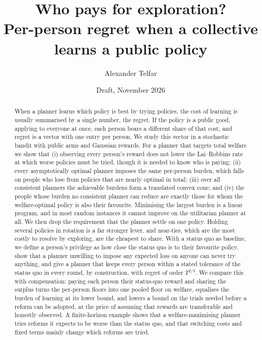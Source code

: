 \documentclass[11pt,a4paper]{article}
\title{Who pays for exploration?\\[2pt]
\large Per-person regret when a collective learns a public policy}
\author{Alexander Telfar}
\date{Draft, November 2026}
\theoremstyle{plain}
\theoremstyle{definition}
\theoremstyle{remark}
\begin{document}
\maketitle

\begin{abstract}
When a planner learns which policy is best by trying policies, the cost of learning is usually summarised by a single number, the regret. If the policy is a public good, applying to everyone at once, each person bears a different share of that cost, and regret is a vector with one entry per person. We study this vector in a stochastic bandit with public arms and Gaussian rewards. For a planner that targets total welfare we show that (i) observing every person's reward does not lower the Lai--Robbins rate at which worse policies must be tried, though it is needed to know who is paying; (ii) every asymptotically optimal planner imposes the same per-person burden, which falls on people who lose from policies that are nearly optimal in total; (iii) over all consistent planners the achievable burdens form a translated convex cone; and (iv) the people whose burden no consistent planner can reduce are exactly those for whom the welfare-optimal policy is also their favourite. Minimising the largest burden is a linear program, and in most random instances it cannot improve on the utilitarian planner at all. We then drop the requirement that the planner settle on one policy. Holding several policies in rotation is a far stronger lever, and near-ties, which are the most costly to resolve by exploring, are the cheapest to share. With a status quo as baseline, we define a person's privilege as how close the status quo is to their favourite policy, show that a planner unwilling to impose any expected loss on anyone can never try anything, and give a planner that keeps every person within a stated tolerance of the status quo in every round, by construction, with regret of order $T^{2/3}$. We compare this with compensation: paying each person their status-quo reward and sharing the surplus turns the per-person floors into one pooled floor on welfare, equalises the burden of learning at its lower bound, and lowers a bound on the trials needed before a reform can be adopted, at the price of assuming that rewards are transferable and honestly observed. A finite-horizon example shows that a welfare-maximising planner tries reforms it expects to be worse than the status quo, and that switching costs and fixed terms mainly change which reforms are tried.
\end{abstract}
\end{document}
